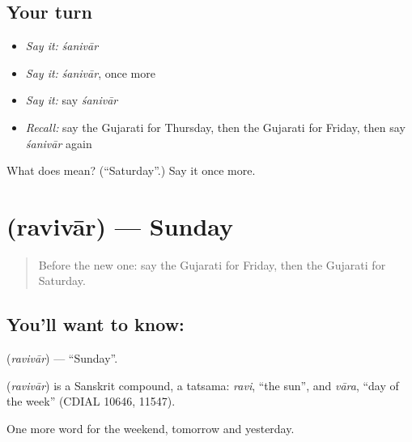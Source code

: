 \subsection*{Your turn}
\begin{itemize}
\raggedright
  \item \emph{Say it:} \emph{śanivār}
  \item \emph{Say it:} \emph{śanivār}, once more
  \item \emph{Say it:} say \emph{śanivār}
  \item \emph{Recall:} say the Gujarati for Thursday, then the Gujarati for Friday, then say \emph{śanivār} again
\end{itemize}

\begin{tcolorbox}[breakable,colback=teal!4,colframe=teal!35!black,title={Before you move on}]
What does  mean? (\textquotedblleft{}Saturday\textquotedblright{}.) Say it once more.
\end{tcolorbox}
\section[\texorpdfstring{\gu{રવિવાર} (ravivār)}{રવિવાર (ravivār)}]{ (ravivār) — Sunday}

\label{lesson:GU-C79-sunday}



\begin{quote}
Before the new one: say the Gujarati for Friday, then the Gujarati for Saturday.
\end{quote}

\subsection*{You'll want to know: }
\textbf{} (\emph{ravivār}) — \textquotedblleft{}Sunday\textquotedblright{}.

\begin{cousinweb}
\textbf{} (\emph{ravivār}) is a Sanskrit compound, a tatsama: \emph{ravi}, \textquotedblleft{}the sun\textquotedblright{}, and \emph{vāra}, \textquotedblleft{}day of the week\textquotedblright{} (CDIAL 10646, 11547).
\end{cousinweb}

\begin{grammarlens}[title={What you've built}]
One more word for the weekend, tomorrow and yesterday.
\end{grammarlens}


